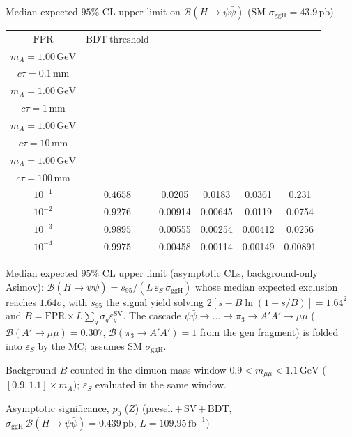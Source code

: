 \documentclass[10pt,a4paper]{article}
\begin{document}
{\vspace{12pt}

Median expected $95\%$ CL upper limit on $\mathcal{B}(H\to\psi\bar{\psi})$ (SM $\sigma_{\mathrm{ggH}}=43.9\,\mathrm{pb}$)

\begin{tabular}{cccccc}
\toprule
$\mathrm{FPR}$ & $\mathrm{BDT\ threshold}$ & \shortstack{$m_{\pi}=10\,\mathrm{GeV}$\\$m_{A}=1.00\,\mathrm{GeV}$\\$c\tau=0.1\,\mathrm{mm}$} & \shortstack{$m_{\pi}=10\,\mathrm{GeV}$\\$m_{A}=1.00\,\mathrm{GeV}$\\$c\tau=1\,\mathrm{mm}$} & \shortstack{$m_{\pi}=10\,\mathrm{GeV}$\\$m_{A}=1.00\,\mathrm{GeV}$\\$c\tau=10\,\mathrm{mm}$} & \shortstack{$m_{\pi}=10\,\mathrm{GeV}$\\$m_{A}=1.00\,\mathrm{GeV}$\\$c\tau=100\,\mathrm{mm}$} \\
\midrule
$10^{-1}$ & $0.4658$ & 0.0205 & 0.0183 & 0.0361 & 0.231\\
$10^{-2}$ & $0.9276$ & 0.00914 & 0.00645 & 0.0119 & 0.0754\\
$10^{-3}$ & $0.9895$ & 0.00555 & 0.00254 & 0.00412 & 0.0256\\
$10^{-4}$ & $0.9975$ & 0.00458 & 0.00114 & 0.00149 & 0.00891\\
\bottomrule
\end{tabular}

{\small Median expected $95\%$ CL upper limit (asymptotic CLs, background-only Asimov): $\mathcal{B}(H\to\psi\bar{\psi})=s_{95}/(L\,\varepsilon_S\,\sigma_{\mathrm{ggH}})$ whose median expected exclusion reaches $1.64\sigma$, with $s_{95}$ the signal yield solving $2[s-B\ln(1{+}s/B)]=1.64^2$ and $B=\mathrm{FPR}\times L\sum_q\sigma_q\varepsilon_q^{\mathrm{SV}}$. The cascade $\psi\bar{\psi}\to\ldots\to\pi_3\to A'A'\to\mu\mu$ ($\mathcal{B}(A'\to\mu\mu)=0.307$, $\mathcal{B}(\pi_3\to A'A')=1$ from the gen fragment) is folded into $\varepsilon_S$ by the MC; assumes SM $\sigma_{\mathrm{ggH}}$.}

{\small Background $B$ counted in the dimuon mass window $0.9<m_{\mu\mu}<1.1\,\mathrm{GeV}$ ($[0.9,1.1]\times m_A$); $\varepsilon_S$ evaluated in the same window.}

\vspace{12pt}

Asymptotic significance, $p_0$ ($Z$) (presel.\,$+$\,SV\,$+$\,BDT, $\sigma_{\mathrm{ggH}}\,\mathcal{B}(H\to\psi\bar{\psi})=0.439\,\mathrm{pb}$, $L=109.95\,\mathrm{fb}^{-1}$)

}
\end{document}
